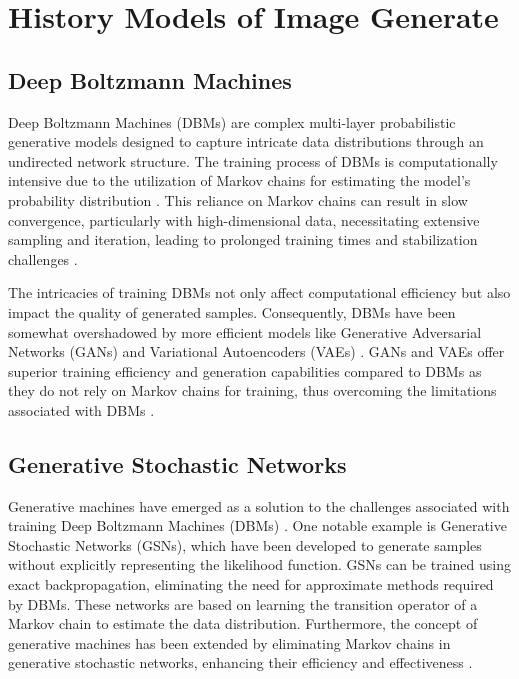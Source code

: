 \chapter{History Models of Image Generate}
\label{Related Work}

\section*{Deep Boltzmann Machines}

Deep Boltzmann Machines (DBMs) are complex multi-layer probabilistic generative models designed to capture intricate data distributions through an undirected network structure. The training process of DBMs is computationally intensive due to the utilization of Markov chains for estimating the model's probability distribution \citep{10.3390/a11040042}. This reliance on Markov chains can result in slow convergence, particularly with high-dimensional data, necessitating extensive sampling and iteration, leading to prolonged training times and stabilization challenges \citep{10.3390/a11040042}.

The intricacies of training DBMs not only affect computational efficiency but also impact the quality of generated samples. Consequently, DBMs have been somewhat overshadowed by more efficient models like Generative Adversarial Networks (GANs) and Variational Autoencoders (VAEs) \citep{10.1016/s0364-0213(85)80012-4}. GANs and VAEs offer superior training efficiency and generation capabilities compared to DBMs as they do not rely on Markov chains for training, thus overcoming the limitations associated with DBMs \citep{10.1016/s0364-0213(85)80012-4}.




\section*{Generative Stochastic Networks}

Generative machines have emerged as a solution to the challenges associated with training Deep Boltzmann Machines (DBMs) \citep{10.1093/imaiai/iaw003}. One notable example is Generative Stochastic Networks (GSNs), which have been developed to generate samples without explicitly representing the likelihood function. GSNs can be trained using exact backpropagation, eliminating the need for approximate methods required by DBMs. These networks are based on learning the transition operator of a Markov chain to estimate the data distribution. Furthermore, the concept of generative machines has been extended by eliminating Markov chains in generative stochastic networks, enhancing their efficiency and effectiveness \citep{10.48550/arxiv.2302.09465}.

